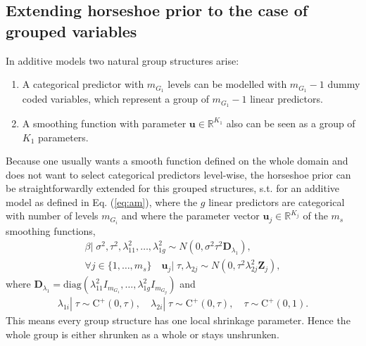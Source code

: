 \documentclass[12pt,letterpaper]{article}
\numberwithin{equation}{subsection}
\begin{document}
\subsection{Extending horseshoe prior to the case of grouped variables}
\label{sec:hsg}
In additive models two natural group structures arise:
\begin{enumerate}
\item A categorical predictor with $m_{G_1}$ levels can be modelled with $m_{G_1} -1$ dummy coded variables, which represent a group of $m_{G_1} - 1$ linear predictors.
\item A smoothing function with parameter $\mathbf{u} \in \mathbb{R}^{K_1}$ also can be seen as a group of $K_1$ parameters. 
\end{enumerate}
Because one usually wants a smooth function defined on the whole domain and does not want to select categorical predictors level-wise, the horseshoe prior can be straightforwardly extended for this grouped structures, s.t. for an additive model as defined in Eq. (\ref{eq:am}), where the $g$ linear predictors are categorical with number of levels $m_{G_i}$ and where the parameter vector $\mathbf{u}_j \in \mathbb{R}^{K_j}$ of the $m_s$ smoothing functions,
\begin{align}
\beta|\; \sigma^2,\tau^2, \lambda^2_{11},\dots,\lambda^2_{1g} \sim N(0, \sigma^2\tau^2\mathbf{D}_{\lambda_1}),\\
\forall j \in  \{1,\dots,m_s\}\quad \mathbf{u}_j|\; \tau, \lambda_{2j}  \sim N(0, \tau^2\lambda_{2j}^2\mathbf{Z}_j),
\end{align}
where $\mathbf{D}_{\lambda_1} = \text{diag}(\lambda_{11}^2I_{m_{G_1}},\dots,\lambda_{1g}^2I_{m_{G_g}})$ and 
\begin{align*}
\lambda_{1i}|\;\tau \sim \text{C}^+(0,\tau), \quad \lambda_{2i}|\;\tau \sim \text{C}^+(0,\tau), \quad \tau \sim \text{C}^+(0,1).
\end{align*}
This means every group structure has one local shrinkage parameter. Hence the whole group is either shrunken as a whole or stays unshrunken.
\end{document}

